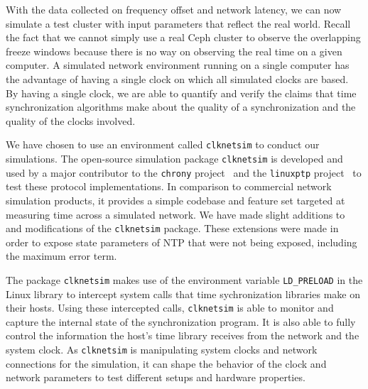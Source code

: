 With the data collected on frequency offset and network latency, we can 
now simulate a test cluster with input parameters that reflect the 
real world. Recall the fact that we cannot simply use a real Ceph
cluster to observe the overlapping freeze windows because there is no
way on observing the real time on a given computer. A
simulated network environment running on a single computer has the
advantage of having a single clock on which all simulated clocks are
based. By having a single clock, we are able to quantify and verify
the claims that time synchronization algorithms make about the quality
of a synchronization and the quality of the clocks involved.

We have chosen to use an environment called \texttt{clknetsim} %
to conduct our simulations. The open-source simulation package 
\texttt{clknetsim} is 
developed and used by a major contributor to the \texttt{chrony}
project~\citep{chrony} and the \texttt{linuxptp} project~\citep{linuxptp}
to test these protocol implementations. In
comparison to commercial network simulation products, it provides a 
simple codebase and feature set targeted at measuring 
time across a simulated network. We have made slight additions to and
modifications of the \texttt{clknetsim} package. These extensions were made in 
order to expose state parameters of NTP that were not being exposed, 
including the maximum error term.

The package \texttt{clknetsim} makes use of the environment variable \texttt{LD\_PRELOAD} in
the Linux library to intercept system calls that time sychronization 
libraries make on their hosts. Using these intercepted calls, 
\texttt{clknetsim} is able to monitor and capture the internal state of
the synchronization program. It is also able to fully control the
information the host's time library receives from the network and the system
clock. As \texttt{clknetsim} is manipulating system clocks and network
connections for the simulation, it can shape the behavior of the clock
and network parameters to test different setups and hardware properties. 

